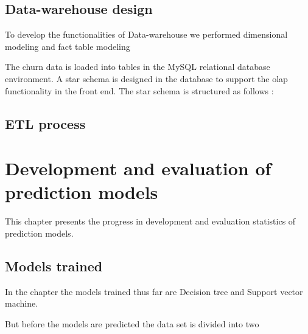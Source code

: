 \section{Data-warehouse design}

To develop the functionalities of Data-warehouse we performed dimensional modeling and fact table modeling

The churn data is loaded into tables in the MySQL relational database environment. A star schema is designed in the database to support the olap functionality in the front end. The star schema is structured as follows :



\section{ETL process}


\chapter{Development and evaluation of prediction models}
\label{ch:depm}
This chapter presents the progress in development and evaluation statistics of prediction models.

\section{Models trained}

In the chapter the models trained thus far are Decision tree and Support vector machine.

But before the models are predicted the data set is divided into two 

